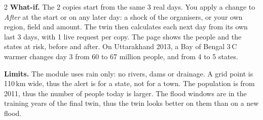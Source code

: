 \documentclass[10pt]{article}
\begin{document}
\begin{multicols}{2}
\textbf{What-if.} The 2 copies start from the same 3 real days. You apply a change to \emph{After} at the start or on
any later day: a shock of the organisers, or your own region, field and amount. The twin then calculates each next day
from its own last 3 days, with 1 live request per copy. The page shows the people and the states at risk, before and
after. On Uttarakhand 2013, a Bay of Bengal 3\,\textdegree C warmer changes day 3 from 60 to 67 million people, and
from 4 to 5 states.

\textbf{Limits.} The module uses rain only: no rivers, dams or drainage. A grid point is 110\,km wide, thus the alert
is for a state, not for a town. The population is from 2011, thus the number of people today is larger. The flood
windows are in the training years of the final twin, thus the twin looks better on them than on a new flood.

\end{multicols}
\end{document}
